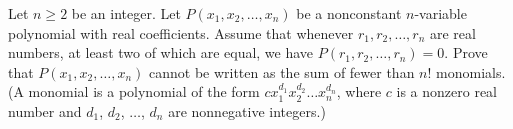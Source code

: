 \begin{enumerate}
 Let $n \geq 2$ be an integer. Let $P(x_1, x_2, \ldots, x_n)$ be a nonconstant $n$-variable polynomial with real coefficients. Assume that whenever $r_1, r_2, \ldots , r_n$ are real numbers, at least two of which are equal, we have $P(r_1, r_2, \ldots , r_n) = 0$. Prove that $P(x_1, x_2, \ldots, x_n)$ cannot be written as the sum of fewer than $n!$ monomials. (A monomial is a polynomial of the form $cx^{d_1}_1 x^{d_2}_2\ldots x^{d_n}_n$, where $c$ is a nonzero real number and $d_1$, $d_2$, $\ldots$, $d_n$ are nonnegative integers.)


 

\end{enumerate}